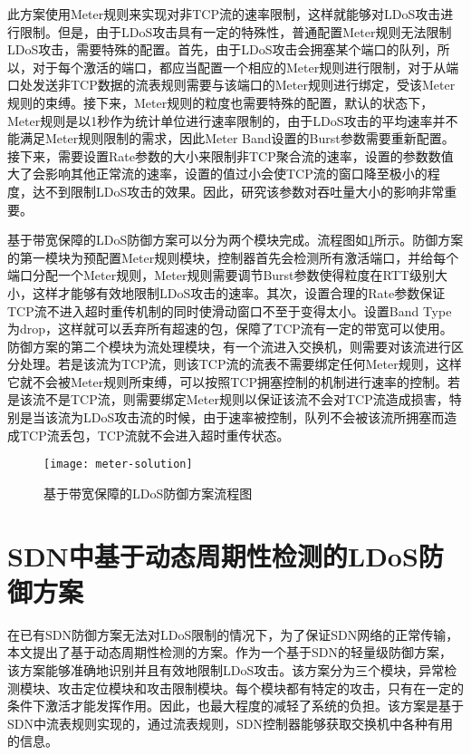 此方案使用Meter规则来实现对非TCP流的速率限制，这样就能够对LDoS攻击进行限制。但是，由于LDoS攻击具有一定的特殊性，普通配置Meter规则无法限制LDoS攻击，需要特殊的配置。首先，由于LDoS攻击会拥塞某个端口的队列，所以，对于每个激活的端口，都应当配置一个相应的Meter规则进行限制，对于从端口处发送非TCP数据的流表规则需要与该端口的Meter规则进行绑定，受该Meter规则的束缚。接下来，Meter规则的粒度也需要特殊的配置，默认的状态下，Meter规则是以1秒作为统计单位进行速率限制的，由于LDoS攻击的平均速率并不能满足Meter规则限制的需求，因此Meter Band设置的Burst参数需要重新配置。接下来，需要设置Rate参数的大小来限制非TCP聚合流的速率，设置的参数数值大了会影响其他正常流的速率，设置的值过小会使TCP流的窗口降至极小的程度，达不到限制LDoS攻击的效果。因此，研究该参数对吞吐量大小的影响非常重要。


基于带宽保障的LDoS防御方案可以分为两个模块完成。流程图如\ref{fig:meter-solution}所示。防御方案的第一模块为预配置Meter规则模块，控制器首先会检测所有激活端口，并给每个端口分配一个Meter规则，Meter规则需要调节Burst参数使得粒度在RTT级别大小，这样才能够有效地限制LDoS攻击的速率。其次，设置合理的Rate参数保证TCP流不进入超时重传机制的同时使滑动窗口不至于变得太小。设置Band Type为drop，这样就可以丢弃所有超速的包，保障了TCP流有一定的带宽可以使用。防御方案的第二个模块为流处理模块，有一个流进入交换机，则需要对该流进行区分处理。若是该流为TCP流，则该TCP流的流表不需要绑定任何Meter规则，这样它就不会被Meter规则所束缚，可以按照TCP拥塞控制的机制进行速率的控制。若是该流不是TCP流，则需要绑定Meter规则以保证该流不会对TCP流造成损害，特别是当该流为LDoS攻击流的时候，由于速率被控制，队列不会被该流所拥塞而造成TCP流丢包，TCP流就不会进入超时重传状态。



\begin{figure}
    \centering
    \texttt{[image: meter-solution]}
    \caption{基于带宽保障的LDoS防御方案流程图}
    \label{fig:meter-solution}
\end{figure}


\section{SDN中基于动态周期性检测的LDoS防御方案}
\label{chap4:SoftGuard}
在已有SDN防御方案无法对LDoS限制的情况下，为了保证SDN网络的正常传输，本文提出了基于动态周期性检测的方案。作为一个基于SDN的轻量级防御方案，该方案能够准确地识别并且有效地限制LDoS攻击。该方案分为三个模块，异常检测模块、攻击定位模块和攻击限制模块。每个模块都有特定的攻击，只有在一定的条件下激活才能发挥作用。因此，也最大程度的减轻了系统的负担。该方案是基于SDN中流表规则实现的，通过流表规则，SDN控制器能够获取交换机中各种有用的信息。

